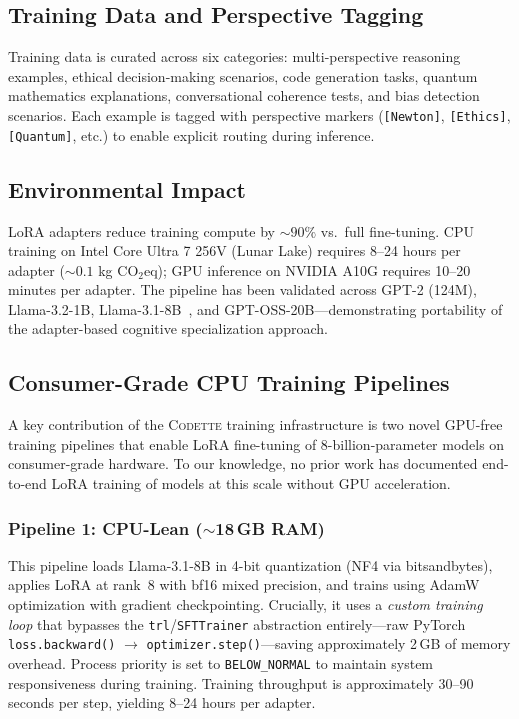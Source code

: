 \documentclass[11pt,a4paper]{article}
\newcommand{\codette}{\textsc{Codette}}
\begin{document}
\subsection{Training Data and Perspective Tagging}
Training data is curated across six categories: multi-perspective reasoning examples, ethical decision-making scenarios, code generation tasks, quantum mathematics explanations, conversational coherence tests, and bias detection scenarios. Each example is tagged with perspective markers (\texttt{[Newton]}, \texttt{[Ethics]}, \texttt{[Quantum]}, etc.) to enable explicit routing during inference.

\subsection{Environmental Impact}
LoRA adapters reduce training compute by ${\sim}90\%$ vs.\ full fine-tuning. CPU training on Intel Core Ultra 7 256V (Lunar Lake) requires 8--24 hours per adapter (${\sim}0.1$ kg CO$_2$eq); GPU inference on NVIDIA A10G requires 10--20 minutes per adapter. The pipeline has been validated across GPT-2 (124M), Llama-3.2-1B, Llama-3.1-8B~\citep{grattafiori2024llama}, and GPT-OSS-20B---demonstrating portability of the adapter-based cognitive specialization approach.

\subsection{Consumer-Grade CPU Training Pipelines}
\label{sec:cpu_pipelines}

A key contribution of the \codette{} training infrastructure is two novel GPU-free training pipelines that enable LoRA fine-tuning of 8-billion-parameter models on consumer-grade hardware. To our knowledge, no prior work has documented end-to-end LoRA training of models at this scale without GPU acceleration.

\subsubsection{Pipeline 1: CPU-Lean (${\sim}$18\,GB RAM)}
This pipeline loads Llama-3.1-8B in 4-bit quantization (NF4 via bitsandbytes), applies LoRA at rank~8 with bf16 mixed precision, and trains using AdamW optimization with gradient checkpointing. Crucially, it uses a \emph{custom training loop} that bypasses the \texttt{trl}/\texttt{SFTTrainer} abstraction entirely---raw PyTorch \texttt{loss.backward()} $\to$ \texttt{optimizer.step()}---saving approximately 2\,GB of memory overhead. Process priority is set to \texttt{BELOW\_NORMAL} to maintain system responsiveness during training. Training throughput is approximately 30--90 seconds per step, yielding 8--24 hours per adapter.
\end{document}
